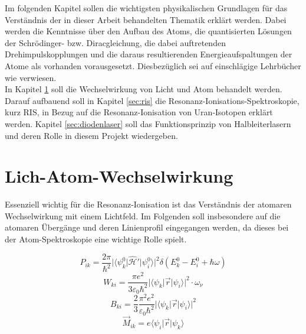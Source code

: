 Im folgenden Kapitel sollen die wichtigsten physikalischen Grundlagen für das
Verständnis der in dieser Arbeit behandelten Thematik erklärt werden. Dabei
werden die Kenntnisse über den Aufbau des Atoms, die quantisierten Lösungen der
Schrödinger- bzw. Diracgleichung, die dabei auftretenden Drehimpulskopplungen
und die daraus resultierenden Energieaufspaltungen der Atome als vorhanden
vorausgesetzt. Diesbezüglich sei auf einschlägige Lehrbücher wie
\cite{demtroeder:ex3} verwiesen.\\
In Kapitel \ref{sec:licht-atom-wechselwirkung} soll die Wechselwirkung von
Licht und Atom behandelt werden. Darauf aufbauend soll
in Kapitel \ref{sec:ris} die Resonanz-Ionisations-Spektroskopie,
kurz RIS, in Bezug auf die Resonanz-Ionisation von Uran-Isotopen erklärt
werden. Kapitel \ref{sec:diodenlaser} soll das Funktionsprinzip von
Halbleiterlasern und deren Rolle in diesem Projekt wiedergeben.

\section{Lich-Atom-Wechselwirkung}\label{sec:licht-atom-wechselwirkung}

Essenziell wichtig für die Resonanz-Ionisation ist das Verständnis der atomaren
Wechselwirkung mit einem Lichtfeld. Im Folgenden soll insbesondere auf die
atomaren Übergänge und deren Linienprofil eingegangen werden, da dieses bei der
Atom-Spektroskopie eine wichtige Rolle spielt.


$$P_{ik}=\frac{2\pi}{\hbar^2}\lvert\langle\psi_k^0\rvert\hat{\mathcal{H}}'\lvert\psi_i^0\rangle\rvert^2\delta(E_k^0-E_i^0+\hbar\omega)$$
$$W_{ki}=\frac{\pi e^2}{3\varepsilon_0\hbar^2}\lvert\langle\psi_k\rvert\vec{r}\lvert\psi_i\rangle\rvert^2\cdot\omega_{\nu}$$
$$B_{ki}=\frac{2}{3}\frac{\pi^2e^2}{\varepsilon_0\hbar^2}\lvert\langle\psi_k\rvert\vec{r}\lvert\psi_i\rangle\rvert^2$$
$$\vec{M}_{ik}=e\langle\psi_i\rvert\vec{r}\lvert\psi_k\rangle$$


